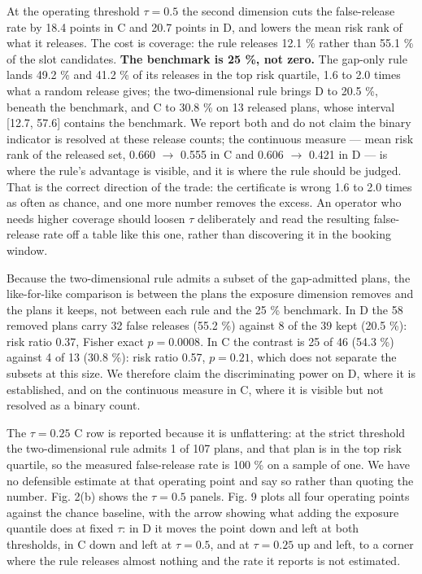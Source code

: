 \documentclass[preprint,12pt,letterpaper]{elsarticle}
\theoremstyle{definition}
\theoremstyle{plain}
\begin{document}
At the operating threshold $\tau = 0.5$ the second dimension cuts the false-release rate by 18.4 points in C and 20.7 points in D, and lowers the mean risk rank of what it releases. The cost is coverage: the rule releases 12.1 \% rather than 55.1 \% of the slot candidates. \textbf{The benchmark is 25 \%, not zero.} The gap-only rule lands 49.2 \% and 41.2 \% of its releases in the top risk quartile, 1.6 to 2.0 times what a random release gives; the two-dimensional rule brings D to 20.5 \%, beneath the benchmark, and C to 30.8 \% on 13 released plans, whose interval [12.7, 57.6] contains the benchmark. We report both and do not claim the binary indicator is resolved at these release counts; the continuous measure --- mean risk rank of the released set, 0.660 $\to$ 0.555 in C and 0.606 $\to$ 0.421 in D --- is where the rule's advantage is visible, and it is where the rule should be judged. That is the correct direction of the trade: the certificate is wrong 1.6 to 2.0 times as often as chance, and one more number removes the excess. An operator who needs higher coverage should loosen $\tau$ deliberately and read the resulting false-release rate off a table like this one, rather than discovering it in the booking window.

Because the two-dimensional rule admits a subset of the gap-admitted plans, the like-for-like comparison is between the plans the exposure dimension removes and the plans it keeps, not between each rule and the 25 \% benchmark. In D the 58 removed plans carry 32 false releases (55.2 \%) against 8 of the 39 kept (20.5 \%): risk ratio 0.37, Fisher exact $p = 0.0008$. In C the contrast is 25 of 46 (54.3 \%) against 4 of 13 (30.8 \%): risk ratio 0.57, $p = 0.21$, which does not separate the subsets at this size. We therefore claim the discriminating power on D, where it is established, and on the continuous measure in C, where it is visible but not resolved as a binary count.

The $\tau = 0.25$ C row is reported because it is unflattering: at the strict threshold the two-dimensional rule admits 1 of 107 plans, and that plan is in the top risk quartile, so the measured false-release rate is 100 \% on a sample of one. We have no defensible estimate at that operating point and say so rather than quoting the number. Fig. 2(b) shows the $\tau = 0.5$ panels. Fig. 9 plots all four operating points against the chance baseline, with the arrow showing what adding the exposure quantile does at fixed $\tau$: in D it moves the point down and left at both thresholds, in C down and left at $\tau = 0.5$, and at $\tau = 0.25$ up and left, to a corner where the rule releases almost nothing and the rate it reports is not estimated.
\end{document}
